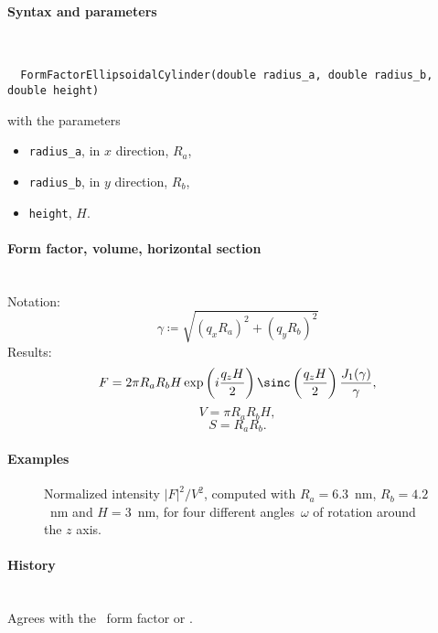 \paragraph{Syntax and parameters}\strut\\[-2ex plus .2ex minus .2ex]
\begin{lstlisting}
  FormFactorEllipsoidalCylinder(double radius_a, double radius_b, double height)
\end{lstlisting}
with the parameters
\begin{itemize}
\item \texttt{radius\_a}, in $x$ direction, $R_a$,
\item \texttt{radius\_b}, in $y$ direction, $R_b$,
\item \texttt{height}, $H$.
\end{itemize}

\paragraph{Form factor, volume, horizontal section}\strut\\
Notation:
\begin{equation*}
  \gamma \coloneqq \sqrt{(q_x R_a)^2+(q_y R_b)^2}
\end{equation*}
Results:
\begin{equation*}
F = 2\pi R_a R_b H \exp\left(i\frac{q_z H}{2}\right)
   \sinc\left(\frac{q_z H}{2}\right) \frac{J_1(\gamma)}{\gamma},
\end{equation*}
\begin{equation*}
  V = \pi R_a R_bH,
\end{equation*}
\begin{equation*}
  S = R_a R_b.
\end{equation*}

\paragraph{Examples}\strut

\begin{figure}[H]
\begin{center}
\end{center}
\caption{Normalized intensity $|F|^2/V^2$,
computed with $R_a=6.3$~nm, $R_b=4.2$~nm and $H=3$~nm,
for four different angles~$\omega$ of rotation around the $z$ axis.}
\end{figure}

\paragraph{History}\strut\\
Agrees with the \IsGISAXS\ form factor
 \cite[Eq.~2.41, wrongly labeled in Fig.~2.4]{Laz06}
or  \cite[Eq.~224]{ReLL09}.

